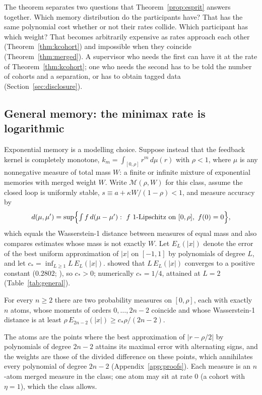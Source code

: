The theorem separates two questions that Theorem~\ref{prop:esprit} answers together. Which memory distribution do the participants have? That has the same polynomial cost whether or not their rates collide. Which participant has which weight? That becomes arbitrarily expensive as rates approach each other (Theorem~\ref{thm:kcohort}) and impossible when they coincide (Theorem~\ref{thm:merged}). A supervisor who needs the first can have it at the rate of Theorem~\ref{thm:kcohort}; one who needs the second has to be told the number of cohorts and a separation, or has to obtain tagged data (Section~\ref{sec:disclosure}).

\subsection{General memory: the minimax rate is logarithmic}\label{sec:general}

Exponential memory is a modelling choice. Suppose instead that the feedback kernel is completely monotone, $k_m=\int_{[0,\rho]}r^m\,d\mu(r)$ with $\rho<1$, where $\mu$ is any nonnegative measure of total mass $W$: a finite or infinite mixture of exponential memories with merged weight $W$. Write $\mathcal M(\rho,W)$ for this class, assume the closed loop is uniformly stable, $s\equiv a+\kappa W/(1-\rho)<1$, and measure accuracy by
\[
d(\mu,\mu')=\sup\Bigl\{\textstyle\int f\,d(\mu-\mu'):\ f\ \text{1-Lipschitz on }[0,\rho],\ f(0)=0\Bigr\},
\]
which equals the Wasserstein-1 distance between measures of equal mass and also compares estimates whose mass is not exactly $W$. Let $E_L(|x|)$ denote the error of the best uniform approximation of $|x|$ on $[-1,1]$ by polynomials of degree $L$, and let $c_*=\inf_{L\ge1}L\,E_L(|x|)$. \citet{bernstein1914} showed that $L\,E_L(|x|)$ converges to a positive constant ($0.2802$; \citealp{varga1985}), so $c_*>0$; numerically $c_*=1/4$, attained at $L=2$ (Table~\ref{tab:general}).

\begin{lemma}\label{lem:altpair}
For every $n\ge2$ there are two probability measures on $[0,\rho]$, each with exactly $n$ atoms, whose moments of orders $0,\ldots,2n-2$ coincide and whose Wasserstein-1 distance is at least $\rho\,E_{2n-2}(|x|)\ge c_*\rho/(2n-2)$.
\end{lemma}

The atoms are the points where the best approximation of $|r-\rho/2|$ by polynomials of degree $2n-2$ attains its maximal error with alternating signs, and the weights are those of the divided difference on these points, which annihilates every polynomial of degree $2n-2$ (Appendix~\ref{app:proofs}). Each measure is an $n$-atom merged measure in the class; one atom may sit at rate $0$ (a cohort with $\eta=1$), which the class allows.

